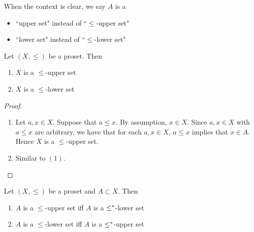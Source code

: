\documentclass{book}
\begin{document}
	\begin{note}
		When the context is clear, we say $A$ is a
		\begin{itemize}
			\item ``upper set" instead of ``$\leq$-upper set"
			\item ``lower set" instead of ``$\leq$-lower set"
		\end{itemize}
	\end{note}
	
	\begin{ex} 
		Let $(X, \leq)$ be a proset. Then 
		\begin{enumerate}
			\item $X$ is a $\leq$-upper set 
			\item $X$ is a $\leq$-lower set
		\end{enumerate}
	\end{ex}
	
	\begin{proof}\
		\begin{enumerate}
			\item Let $a, x \in X$. Suppose that $a \leq x$. By assumption, $x \in X$. Since $a,x \in X$ with $a \leq x$ are arbitrary, we have that for each $a,x \in X$, $a \leq x$ implies that $x \in A$. Hence $X$ is a $\leq$-upper set.
			\item Similar to $(1)$.
		\end{enumerate}
	\end{proof}
	
	\begin{ex} 
		Let $(X, \leq)$ be a proset and $A \subset X$. Then 
		\begin{enumerate}
			\item $A$ is a $\leq$-upper set iff $A$ is a $\leq^*$-lower set
			\item $A$ is a $\leq$-lower set iff $A$ is a $\leq^*$-upper set
		\end{enumerate}
	\end{ex}
	
\end{document}
